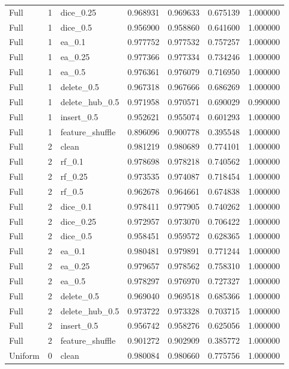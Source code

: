 \documentclass[UTF8,a4paper,11pt,fontset=fandol]{ctexart}
\begin{document}
{\begin{longtable}{lrlrrrr}
Full & 1 & dice\_0.25 & 0.968931 & 0.969633 & 0.675139 & 1.000000 \\
Full & 1 & dice\_0.5 & 0.956900 & 0.958860 & 0.641600 & 1.000000 \\
Full & 1 & ea\_0.1 & 0.977752 & 0.977532 & 0.757257 & 1.000000 \\
Full & 1 & ea\_0.25 & 0.977366 & 0.977334 & 0.734246 & 1.000000 \\
Full & 1 & ea\_0.5 & 0.976361 & 0.976079 & 0.716950 & 1.000000 \\
Full & 1 & delete\_0.5 & 0.967318 & 0.967666 & 0.686269 & 1.000000 \\
Full & 1 & delete\_hub\_0.5 & 0.971958 & 0.970571 & 0.690029 & 0.990000 \\
Full & 1 & insert\_0.5 & 0.952621 & 0.955074 & 0.601293 & 1.000000 \\
Full & 1 & feature\_shuffle & 0.896096 & 0.900778 & 0.395548 & 1.000000 \\
Full & 2 & clean & 0.981219 & 0.980689 & 0.774101 & 1.000000 \\
Full & 2 & rf\_0.1 & 0.978698 & 0.978218 & 0.740562 & 1.000000 \\
Full & 2 & rf\_0.25 & 0.973535 & 0.974087 & 0.718454 & 1.000000 \\
Full & 2 & rf\_0.5 & 0.962678 & 0.964661 & 0.674838 & 1.000000 \\
Full & 2 & dice\_0.1 & 0.978411 & 0.977905 & 0.740262 & 1.000000 \\
Full & 2 & dice\_0.25 & 0.972957 & 0.973070 & 0.706422 & 1.000000 \\
Full & 2 & dice\_0.5 & 0.958451 & 0.959572 & 0.628365 & 1.000000 \\
Full & 2 & ea\_0.1 & 0.980481 & 0.979891 & 0.771244 & 1.000000 \\
Full & 2 & ea\_0.25 & 0.979657 & 0.978562 & 0.758310 & 1.000000 \\
Full & 2 & ea\_0.5 & 0.978297 & 0.976970 & 0.727327 & 1.000000 \\
Full & 2 & delete\_0.5 & 0.969040 & 0.969518 & 0.685366 & 1.000000 \\
Full & 2 & delete\_hub\_0.5 & 0.973722 & 0.973328 & 0.703715 & 1.000000 \\
Full & 2 & insert\_0.5 & 0.956742 & 0.958276 & 0.625056 & 1.000000 \\
Full & 2 & feature\_shuffle & 0.901272 & 0.902909 & 0.385772 & 1.000000 \\
Uniform & 0 & clean & 0.980084 & 0.980660 & 0.775756 & 1.000000 \\

\end{longtable}}
\end{document}
